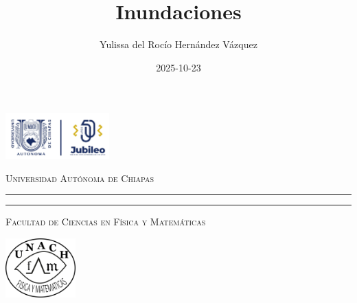 \documentclass[
  spanish,
  us-letterpaper,
]{scrreprt}
\title{Inundaciones}
\author{Yulissa del Rocío Hernández Vázquez}
\date{2025-10-23}
\numberwithin{equation}{chapter} %
\begin{document}
\begin{titlepage}
\hspace{-1.7cm} %
\begin{minipage}[t][0.03\textheight][c]{0.22\textwidth}
        \includegraphics[width=4.0cm]{LOGO-JUBILEO.png}
\end{minipage}\hspace{0.9cm}
\begin{minipage}[t][0.03\textheight][c]{0.69\textwidth}
\begin{center}
                \textsc{\huge Universidad Autónoma de Chiapas}\\[0.3cm]
                \hrule height 2.5pt
                \vspace{0.2cm}
                \hrule height1pt
                \vspace{0.3cm}
                \textsc{\Large Facultad de Ciencias en Física y Matemáticas}
\end{center}
\end{minipage}\hspace{0.2cm}
\begin{minipage}[t][0.03\textheight][c]{0.2\textwidth}
		\includegraphics[width=2.7cm]{FCFMLOGO.png}
\end{minipage}\\
\begin{minipage}[t][0.93\textheight][c]{0.06\textwidth}
\vspace{60pt}
    \begin{center}
        \vrule width1pt height18cm
        \vspace{5mm}
        \vrule width2.5pt height18cm
        \vspace{5mm}
        \vrule width1pt height18cm
   \end{center}
\end{minipage}\hspace{1.3cm} %
\begin{minipage}[t][0.95\textheight][c]{0.76\textwidth}


\end{minipage}
\end{titlepage}
\end{document}
